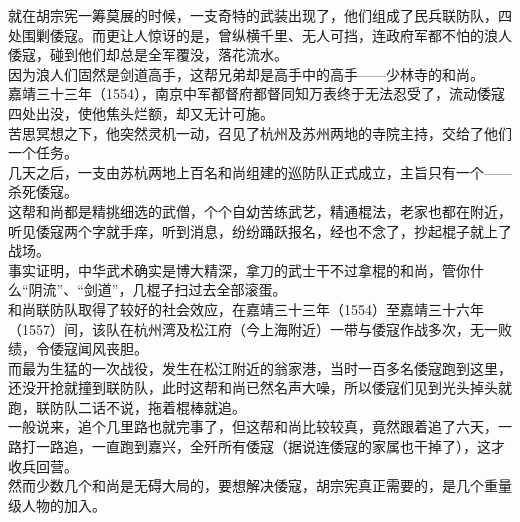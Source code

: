 \begin{multicols}{\theparacolNo}
就在胡宗宪一筹莫展的时候，一支奇特的武装出现了，他们组成了民兵联防队，四处围剿倭寇。而更让人惊讶的是，曾纵横千里、无人可挡，连政府军都不怕的浪人倭寇，碰到他们却总是全军覆没，落花流水。\\

因为浪人们固然是剑道高手，这帮兄弟却是高手中的高手——少林寺的和尚。\\

嘉靖三十三年（1554），南京中军都督府都督同知万表终于无法忍受了，流动倭寇四处出没，使他焦头烂额，却又无计可施。\\

苦思冥想之下，他突然灵机一动，召见了杭州及苏州两地的寺院主持，交给了他们一个任务。\\

几天之后，一支由苏杭两地上百名和尚组建的巡防队正式成立，主旨只有一个——杀死倭寇。\\

这帮和尚都是精挑细选的武僧，个个自幼苦练武艺，精通棍法，老家也都在附近，听见倭寇两个字就手痒，听到消息，纷纷踊跃报名，经也不念了，抄起棍子就上了战场。\\

事实证明，中华武术确实是博大精深，拿刀的武士干不过拿棍的和尚，管你什么“阴流”、“剑道”，几棍子扫过去全部滚蛋。\\

和尚联防队取得了较好的社会效应，在嘉靖三十三年（1554）至嘉靖三十六年（1557）间，该队在杭州湾及松江府（今上海附近）一带与倭寇作战多次，无一败绩，令倭寇闻风丧胆。\\

而最为生猛的一次战役，发生在松江附近的翁家港，当时一百多名倭寇跑到这里，还没开抢就撞到联防队，此时这帮和尚已然名声大噪，所以倭寇们见到光头掉头就跑，联防队二话不说，拖着棍棒就追。\\

一般说来，追个几里路也就完事了，但这帮和尚比较较真，竟然跟着追了六天，一路打一路追，一直跑到嘉兴，全歼所有倭寇（据说连倭寇的家属也干掉了），这才收兵回营。\\

然而少数几个和尚是无碍大局的，要想解决倭寇，胡宗宪真正需要的，是几个重量级人物的加入。\\
\ifnum{}
	\end{multicols}
\fi
\newpage
